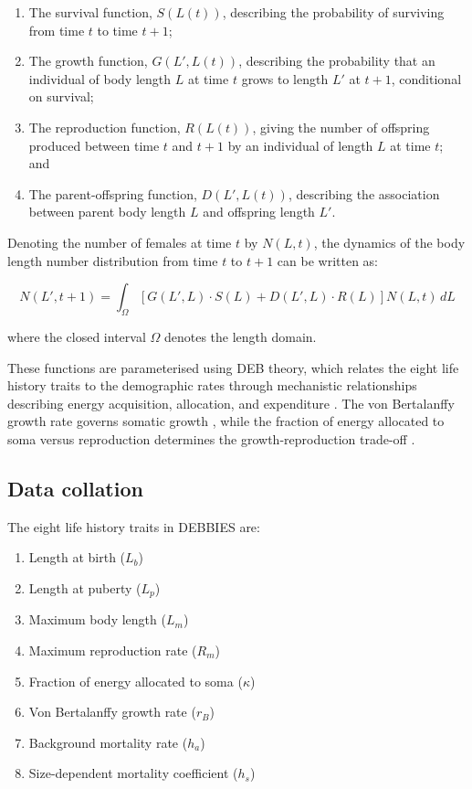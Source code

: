 \documentclass[11pt]{article}
\begin{document}
\begin{enumerate}
\item The survival function, $S(L(t))$, describing the probability of surviving from time $t$ to time $t+1$;
\item The growth function, $G(L', L(t))$, describing the probability that an individual of body length $L$ at time $t$ grows to length $L'$ at $t+1$, conditional on survival;
\item The reproduction function, $R(L(t))$, giving the number of offspring produced between time $t$ and $t+1$ by an individual of length $L$ at time $t$; and
\item The parent-offspring function, $D(L', L(t))$, describing the association between parent body length $L$ and offspring length $L'$.
\end{enumerate}

Denoting the number of females at time $t$ by $N(L, t)$, the dynamics of the body length number distribution from time $t$ to $t+1$ can be written as:

\begin{equation}
N(L', t+1) = \int_{\Omega} \left[ G(L', L) \cdot S(L) + D(L', L) \cdot R(L) \right] N(L, t) \, dL
\end{equation}

where the closed interval $\Omega$ denotes the length domain.

These functions are parameterised using DEB theory, which relates the eight life history traits to the demographic rates through mechanistic relationships describing energy acquisition, allocation, and expenditure \citep{kooijman2010, kooijmanbook2010}. The von Bertalanffy growth rate governs somatic growth \citep{bertalanffy1957}, while the fraction of energy allocated to soma versus reproduction determines the growth-reproduction trade-off \citep{kooijman1984, smallegange2023}.

\subsection{Data collation}

The eight life history traits in DEBBIES are:
\begin{enumerate}
\item Length at birth ($L_b$)
\item Length at puberty ($L_p$)
\item Maximum body length ($L_m$)
\item Maximum reproduction rate ($R_m$)
\item Fraction of energy allocated to soma ($\kappa$)
\item Von Bertalanffy growth rate ($r_B$)
\item Background mortality rate ($h_a$)
\item Size-dependent mortality coefficient ($h_s$)
\end{enumerate}
\end{document}
